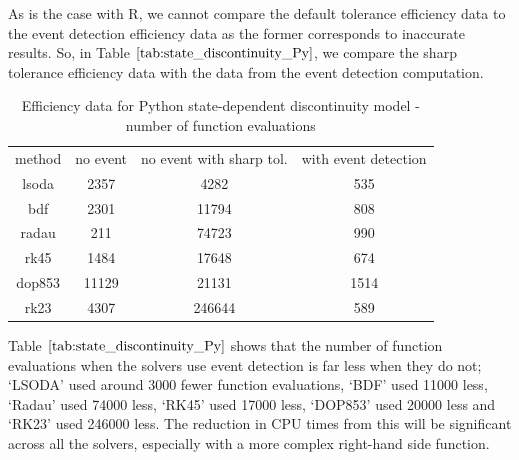 As is the case with R, we cannot compare the default tolerance efficiency data to the event detection efficiency data as the former corresponds to inaccurate results. So, in Table $\ref{tab:state_discontinuity_Py}$, we compare the sharp tolerance efficiency data with the data from the event detection computation.

\begin{table}[h]
\caption {Efficiency data for Python state-dependent discontinuity model - number of function evaluations} \label{tab:state_discontinuity_Py}
\begin{center}
\begin{tabular}{ c c c c } 
method & no event & no event with sharp tol. & with event detection \\ 
lsoda & 2357 & 4282 & 535 \\
bdf & 2301 & 11794 & 808 \\
radau & 211 & 74723 & 990 \\
rk45 & 1484 & 17648 & 674 \\
dop853 & 11129 & 21131 & 1514 \\
rk23 & 4307 & 246644 & 589 \\
\end{tabular}
\end{center}
\end{table}

Table $\ref{tab:state_discontinuity_Py}$ shows that the number of function evaluations when the solvers use event detection is far less when they do not; `LSODA' used around 3000 fewer function evaluations, `BDF' used 11000 less, `Radau' used 74000 less, `RK45' used 17000 less, `DOP853' used 20000 less and `RK23' used 246000 less. The reduction in CPU times from this will be significant across all the solvers, especially with a more complex right-hand side function.

